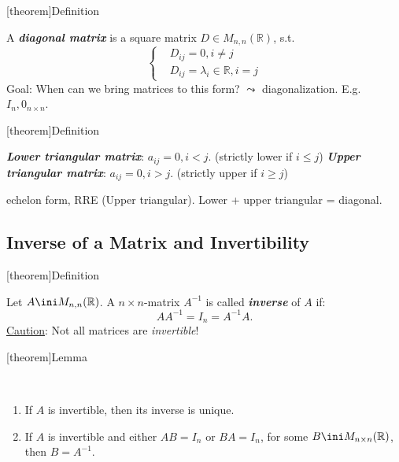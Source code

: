 \documentclass[12pt]{report}
\theoremstyle{definition}
\begin{document}
[theorem]{Definition}
\begin{diagonal matrix}
    A \textbf{\emph{diagonal matrix}} is a square matrix $D \in M_{n,n}(\mathbb{R})$, s.t.\[
        \left\{
            \begin{align*}
                & D_{ij} = 0, i \neq j \\
                & D_{ij} = \lambda_i \in \mathbb{R}, i = j
            \end{align*}
        \right.
    \]
    Goal: When can we bring matrices to this form? $\leadsto$ diagonalization.
    E.g. $I_n, 0_{n\times n}$.
\end{diagonal matrix}

[theorem]{Definition}
\begin{upper and lower triangular matrix}
    \textbf{\emph{Lower triangular matrix}}: $a_{ij} = 0, i < j$. (strictly lower if $i \le j$)
    \textbf{\emph{Upper triangular matrix}}: $a_{ij} = 0, i > j$. (strictly upper if $i \ge j$)
\end{upper and lower triangular matrix}

\begin{ex}
    echelon form, RRE (Upper triangular).
    Lower + upper triangular = diagonal.
\end{ex}

\subsection{Inverse of a Matrix and Invertibility}

[theorem]{Definition}
\begin{inverse square matrix}
    Let $A \ini M_{n,n}(\mathbb{R})$. A $n \times n$-matrix $A^{-1}$ is called \textbf{\emph{inverse}}
    of $A$ if:\[
        AA^{-1} = I_n = A^{-1}A.
    \]
    \underline{Caution}: Not all matrices are \emph{invertible}!
\end{inverse square matrix}

[theorem]{Lemma}
\begin{lemma Of inverse matrix}
    \,

    \begin{enumerate}[label = (\arabic*)]
        \item If $A$ is invertible, then its inverse is unique.
        \item If $A$ is invertible and either $AB = I_n$ or $BA = I_n$, for some $B \ini M_{n\times n}(\mathbb{R})$,
            then $B = A^{-1}$.
    \end{enumerate}
    
\end{lemma Of inverse matrix}
\end{document}
